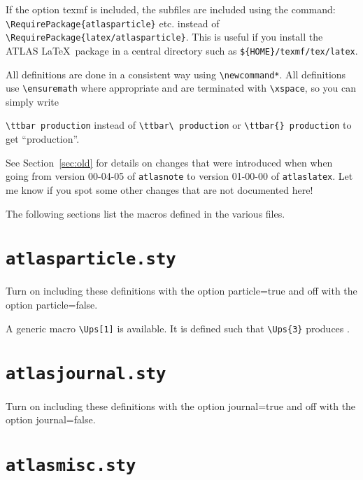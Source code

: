 \documentclass[UKenglish,texlive=2014]{latex/atlasdoc}
\newcommand{\File}[1]{\texttt{#1}\xspace}
\newcommand{\Option}[1]{\textsf{#1}\xspace}
\newcommand{\Package}[1]{\texttt{#1}\xspace}
\begin{document}
If the  option \Option{texmf} is included, the subfiles are included using the command:
\verb|\RequirePackage{atlasparticle}| etc. instead of \verb|\RequirePackage{latex/atlasparticle}|.
This is useful if you install the ATLAS \LaTeX\ package in a central directory such as \File{\$\{HOME\}/texmf/tex/latex}.

All definitions are done in a consistent way using \verb|\newcommand*|.
All definitions use \verb|\ensuremath| where appropriate and are terminated with
\verb|\xspace|, so you can simply write {\verb|\ttbar production| instead of
\verb|\ttbar\ production| or \verb|\ttbar{} production| to get \enquote{\ttbar production}.

See Section~\ref{sec:old} for details on changes that were introduced when
when going from version 00-04-05 of \Package{atlasnote}
to version 01-00-00 of \Package{atlaslatex}.
Let me know if you spot some other changes that are not documented here!

The following sections list the macros defined in the various files.

\twocolumn
\section{\File{atlasparticle.sty}}

Turn on including these definitions with the option \Option{particle=true} and off with the option \Option{particle=false}.



A generic macro \verb|\Ups[1]| is available.
It is defined such that \verb|\Ups{3}| produces .


\newpage
\section{\File{atlasjournal.sty}}

Turn on including these definitions with the option \Option{journal=true} and off with the option \Option{journal=false}.




\newpage
\section{\File{atlasmisc.sty}}

}
\end{document}
